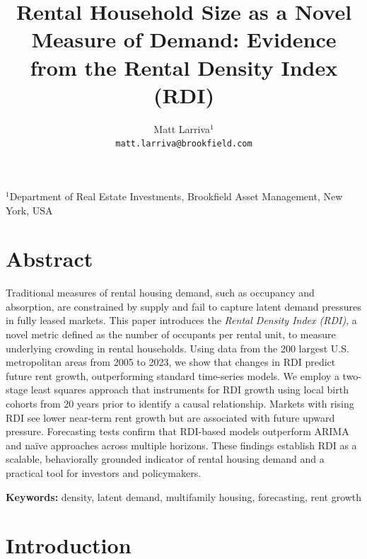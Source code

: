 \documentclass[12pt]{article}
\title{Rental Household Size as a Novel Measure of Demand: Evidence from the Rental Density Index (RDI)}
\author{
	Matt Larriva$^{1}$ \\ \texttt{matt.larriva@brookfield.com}
}
\date{\vspace{-5ex}}  %
\begin{document}
	
	\maketitle
	
	\begin{center}
		$^{1}$Department of Real Estate Investments, Brookfield Asset Management, New York, USA
	\end{center}
	
	\vspace{1em}
	
	\section*{Abstract}
	Traditional measures of rental housing demand, such as occupancy and absorption, are constrained by supply and fail to capture latent demand pressures in fully leased markets. This paper introduces the \emph{Rental Density Index (RDI)}, a novel metric defined as the number of occupants per rental unit, to measure underlying crowding in rental households. Using data from the 200 largest U.S. metropolitan areas from 2005 to 2023, we show that changes in RDI predict future rent growth, outperforming standard time-series models. We employ a two-stage least squares approach that instruments for RDI growth using local birth cohorts from 20 years prior to identify a causal relationship. Markets with rising RDI see lower near-term rent growth but are associated with future upward pressure. Forecasting tests confirm that RDI-based models outperform ARIMA and naïve approaches across multiple horizons. These findings establish RDI as a scalable, behaviorally grounded indicator of rental housing demand and a practical tool for investors and policymakers.\cite{betancourt2022us}
	
	\vspace{1em}
	\noindent\textbf{Keywords:} density, latent demand, multifamily housing, forecasting, rent growth
	
	\newpage
\section{Introduction}
\newpage

\end{document}
